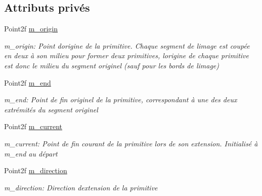 \subsection*{Attributs privés}
\begin{DoxyCompactItemize}
\item 
\mbox{\label{classPrimitive_a42f9cfd7cb6fe5d8222b54184cb01370}} 
Point2f \hyperlink{classPrimitive_a42f9cfd7cb6fe5d8222b54184cb01370}{m\+\_\+origin}
\begin{DoxyCompactList}\small\item\em m\+\_\+origin\+: Point d\textquotesingle{}origine de la primitive. Chaque segment de l\textquotesingle{}image est coupée en deux à son milieu pour former deux primitives, l\textquotesingle{}origine de chaque primitive est donc le milieu du segment originel (sauf pour les bords de l\textquotesingle{}image) \end{DoxyCompactList}\item 
\mbox{\label{classPrimitive_aff19d540e2d8542d34a57c51e6ff73f9}} 
Point2f \hyperlink{classPrimitive_aff19d540e2d8542d34a57c51e6ff73f9}{m\+\_\+end}
\begin{DoxyCompactList}\small\item\em m\+\_\+end\+: Point de fin originel de la primitive, correspondant à une des deux extrémités du segment originel \end{DoxyCompactList}\item 
\mbox{\label{classPrimitive_ac3a589bccaf2d4361a389f229cc44f51}} 
Point2f \hyperlink{classPrimitive_ac3a589bccaf2d4361a389f229cc44f51}{m\+\_\+current}
\begin{DoxyCompactList}\small\item\em m\+\_\+current\+: Point de fin courant de la primitive lors de son extension. Initialisé à m\+\_\+end au départ \end{DoxyCompactList}\item 
\mbox{\label{classPrimitive_a575f14e177bf1d3b2e7f94ff8ca21686}} 
Point2f \hyperlink{classPrimitive_a575f14e177bf1d3b2e7f94ff8ca21686}{m\+\_\+direction}
\begin{DoxyCompactList}\small\item\em m\+\_\+direction\+: Direction d\textquotesingle{}extension de la primitive \end{DoxyCompactList}\item 

\end{DoxyCompactItemize}
